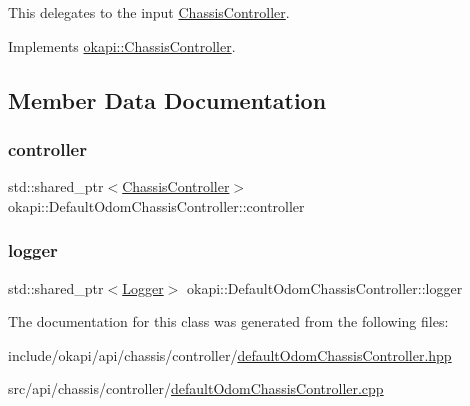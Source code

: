 This delegates to the input \mbox{\hyperlink{classokapi_1_1ChassisController}{Chassis\+Controller}}. 

Implements \mbox{\hyperlink{classokapi_1_1ChassisController_a01ed4e0eb7332cc149228387bbf1e91c}{okapi\+::\+Chassis\+Controller}}.



\subsection{Member Data Documentation}
\mbox{\label{classokapi_1_1DefaultOdomChassisController_a0513b32bd09e7af2b82a5d67895b6165}} 
\subsubsection{\texorpdfstring{controller}{controller}}
{\footnotesize\ttfamily std\+::shared\+\_\+ptr$<$\mbox{\hyperlink{classokapi_1_1ChassisController}{Chassis\+Controller}}$>$ okapi\+::\+Default\+Odom\+Chassis\+Controller\+::controller\hspace{0.3cm}{\ttfamily [protected]}}

\mbox{\label{classokapi_1_1DefaultOdomChassisController_a1e34483ae1bcef368d80b69f54a3b091}} 
\subsubsection{\texorpdfstring{logger}{logger}}
{\footnotesize\ttfamily std\+::shared\+\_\+ptr$<$\mbox{\hyperlink{classokapi_1_1Logger}{Logger}}$>$ okapi\+::\+Default\+Odom\+Chassis\+Controller\+::logger\hspace{0.3cm}{\ttfamily [protected]}}



The documentation for this class was generated from the following files\+:\begin{DoxyCompactItemize}
\item 
include/okapi/api/chassis/controller/\mbox{\hyperlink{defaultOdomChassisController_8hpp}{default\+Odom\+Chassis\+Controller.\+hpp}}\item 
src/api/chassis/controller/\mbox{\hyperlink{defaultOdomChassisController_8cpp}{default\+Odom\+Chassis\+Controller.\+cpp}}\end{DoxyCompactItemize}
